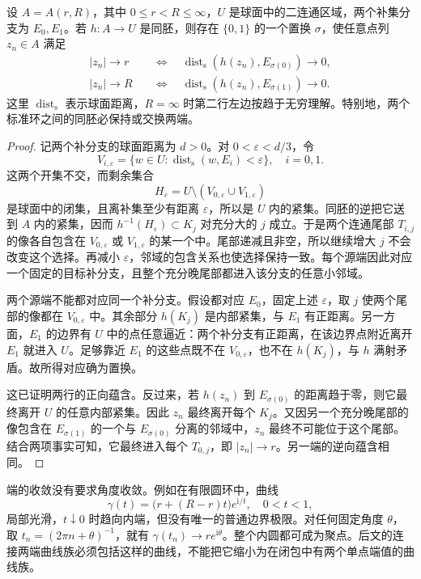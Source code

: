 \begin{lemma}\label{b3:lem:08-annulus-ends}
设 \(A=A(r,R)\)，其中 \(0\le r<R\le\infty\)，\(U\) 是球面中的二连通区域，两个补集分支为 \(E_0,E_1\)。若 \(h:A\to U\) 是同胚，则存在 \(\{0,1\}\) 的一个置换 \(\sigma\)，使任意点列 \(z_n\in A\) 满足
\[
 \begin{aligned}
 |z_n|\to r
 &\quad\Longleftrightarrow\quad
 \operatorname{dist}_{\mathrm s}(h(z_n),E_{\sigma(0)})\to0,\\
 |z_n|\to R
 &\quad\Longleftrightarrow\quad
 \operatorname{dist}_{\mathrm s}(h(z_n),E_{\sigma(1)})\to0.
 \end{aligned}
\]
这里 \(\operatorname{dist}_{\mathrm s}\) 表示球面距离，\(R=\infty\) 时第二行左边按趋于无穷理解。特别地，两个标准环之间的同胚必保持或交换两端。
\end{lemma}
\begin{proof}
记两个补分支的球面距离为 \(d>0\)。对 \(0<\varepsilon<d/3\)，令
\[
 V_{i,\varepsilon}=\{w\in U:
 \operatorname{dist}_{\mathrm s}(w,E_i)<\varepsilon\},
 \quad i=0,1.
\]
这两个开集不交，而剩余集合
\[
 H_\varepsilon=U\setminus(V_{0,\varepsilon}\cup V_{1,\varepsilon})
\]
是球面中的闭集，且离补集至少有距离 \(\varepsilon\)，所以是 \(U\) 内的紧集。同胚的逆把它送到 \(A\) 内的紧集，因而 \(h^{-1}(H_\varepsilon)\subset K_j\) 对充分大的 \(j\) 成立。于是两个连通尾部 \(T_{i,j}\) 的像各自包含在 \(V_{0,\varepsilon}\) 或 \(V_{1,\varepsilon}\) 的某一个中。尾部递减且非空，所以继续增大 \(j\) 不会改变这个选择。再减小 \(\varepsilon\)，邻域的包含关系也使选择保持一致。每个源端因此对应一个固定的目标补分支，且整个充分晚尾部都进入该分支的任意小邻域。

两个源端不能都对应同一个补分支。假设都对应 \(E_0\)，固定上述 \(\varepsilon\)，取 \(j\) 使两个尾部的像都在 \(V_{0,\varepsilon}\) 中。其余部分 \(h(K_j)\) 是内部紧集，与 \(E_1\) 有正距离。另一方面，\(E_1\) 的边界有 \(U\) 中的点任意逼近：两个补分支有正距离，在该边界点附近离开 \(E_1\) 就进入 \(U\)。足够靠近 \(E_1\) 的这些点既不在 \(V_{0,\varepsilon}\)，也不在 \(h(K_j)\)，与 \(h\) 满射矛盾。故所得对应确为置换。

这已证明两行的正向蕴含。反过来，若 \(h(z_n)\) 到 \(E_{\sigma(0)}\) 的距离趋于零，则它最终离开 \(U\) 的任意内部紧集。因此 \(z_n\) 最终离开每个 \(K_j\)。又因另一个充分晚尾部的像包含在 \(E_{\sigma(1)}\) 的一个与 \(E_{\sigma(0)}\) 分离的邻域中，\(z_n\) 最终不可能位于这个尾部。结合两项事实可知，它最终进入每个 \(T_{0,j}\)，即 \(|z_n|\to r\)。另一端的逆向蕴含相同。
\end{proof}
端的收敛没有要求角度收敛。例如在有限圆环中，曲线
\[
 \gamma(t)=\bigl(r+(R-r)t\bigr)e^{\mathrm i/t},\quad 0<t<1,
\]
局部光滑，\(t\downarrow0\) 时趋向内端，但没有唯一的普通边界极限。对任何固定角度 \(\theta\)，取 \(t_n=(2\pi n+\theta)^{-1}\)，就有 \(\gamma(t_n)\to re^{\mathrm i\theta}\)。整个内圆都可成为聚点。后文的连接两端曲线族必须包括这样的曲线，不能把它缩小为在闭包中有两个单点端值的曲线族。

